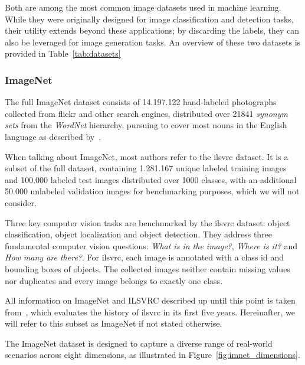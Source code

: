 Both are among the most common image datasets used in machine learning.
While they were originally designed for image classification and detection tasks, their utility extends beyond
these applications; by discarding the labels, they can also be leveraged for image generation tasks.
An overview of these two datasets is provided in Table~\ref{tab:datasets}

\subsubsection{ImageNet}\label{subsec:imagenet}
The full ImageNet dataset consists of 14.197.122 hand-labeled photographs collected from flickr and other search
engines, distributed over 21841 \textit{synonym sets} from the
\textit{WordNet} hierarchy, pursuing to cover most nouns in the English language as described by~\cite{wordnet}.

When talking about ImageNet, most authors refer to the \ac{ilsvrc} dataset.
It is a subset of the full dataset, containing 1.281.167 unique labeled training images and 100.000 labeled test
images distributed over 1000 classes, with an additional 50.000 unlabeled validation images for benchmarking
purposes, which we will not consider.

Three key computer vision tasks are benchmarked by the \ac{ilsvrc} dataset: object classification, object
localization and object detection.
They address three fundamental computer vision questions: \textit{What is in the image?}, \textit{Where is it?} and
\textit{How many are there?}.
For \ac{ilsvrc}, each image is annotated with a class id and bounding boxes of objects.
The collected images neither contain missing values nor duplicates and every image belongs to exactly one class.

All information on ImageNet and ILSVRC described up until this point is taken from~\cite{imagenet_breakdown}, which
evaluates the history of \ac{ilsvrc} in its first five years.
Hereinafter, we will refer to this subset as ImageNet if not stated otherwise.

The ImageNet dataset is designed to capture a diverse range of real-world scenarios across eight dimensions, as
illustrated in Figure~\ref{fig:imnet_dimensions}.

